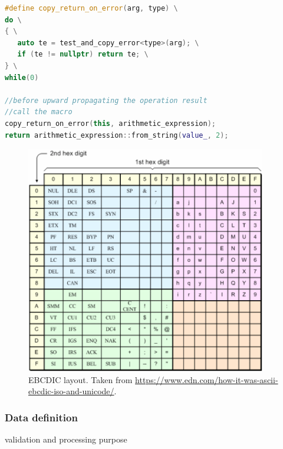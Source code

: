 \begin{lstlisting}[label={ca_expr:example},language=C++,backgroundcolor=\color{cyan!10}, captionpos=b, caption=Defition of \texttt{copy\_return\_on\_error} macro and an example of its usage while evaluating unary expression \texttt{B2A("123")}. \texttt{this} is an \texttt{character\_expression} with value \texttt{"123"}.]
#define copy_return_on_error(arg, type) \
do \
{ \
   auto te = test_and_copy_error<type>(arg); \
   if (te != nullptr) return te; \
} \
while(0)
	
//before upward propagating the operation result
//call the macro
copy_return_on_error(this, arithmetic_expression);
return arithmetic_expression::from_string(value_, 2);

\end{lstlisting}

\begin{figure}
	\centering
	\includegraphics[height=10cm]{img/ebcdic}
	\caption{EBCDIC layout. Taken from \url{https://www.edn.com/how-it-was-ascii-ebcdic-iso-and-unicode/}.}
	\label{ca_expr:ebcdic}
\end{figure}

\subsubsection{Data definition}

validation and processing purpose